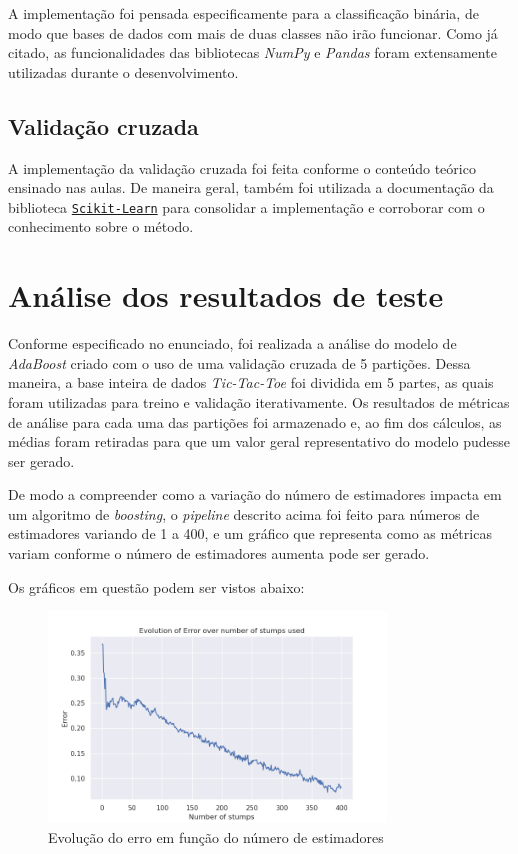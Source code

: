 \documentclass{article}
\begin{document}
A implementação foi pensada especificamente para a classificação binária, de
modo que bases de dados com mais de duas classes não irão funcionar. Como já
citado, as funcionalidades das bibliotecas \textit{NumPy} e \textit{Pandas}
foram extensamente utilizadas durante o desenvolvimento.

\subsection{Validação cruzada}

A implementação da validação cruzada foi feita conforme o conteúdo teórico
ensinado nas aulas. De maneira geral,
também foi utilizada a documentação da biblioteca
\href{https://scikit-learn.org/stable/modules/cross_validation.html}{\texttt{Scikit-Learn}}
para consolidar a implementação e corroborar com o conhecimento sobre o método.

\section{Análise dos resultados de teste}

Conforme especificado no enunciado, foi realizada a análise do modelo de
\textit{AdaBoost} criado com
o uso de uma validação cruzada de 5 partições. Dessa maneira, a base inteira de
dados \textit{Tic-Tac-Toe}
foi dividida em 5 partes, as quais foram utilizadas para treino e validação
iterativamente. Os resultados de métricas
de análise para cada uma das partições foi armazenado e, ao fim dos cálculos,
as médias foram retiradas para que um valor geral representativo
do modelo pudesse ser gerado.

De modo a compreender como a variação do número de estimadores impacta em um
algoritmo de \textit{boosting},
o \textit{pipeline} descrito acima foi feito para números de estimadores
variando de 1 a 400, e um gráfico que
representa como as métricas variam conforme o número de estimadores aumenta
pode ser gerado.

Os gráficos em questão podem ser vistos abaixo:

\begin{figure}[H]
    \centering
    \includegraphics[width=0.8\textwidth]{images/Error.png}
    \caption{Evolução do erro em função do número de estimadores}
\end{figure}
\end{document}

